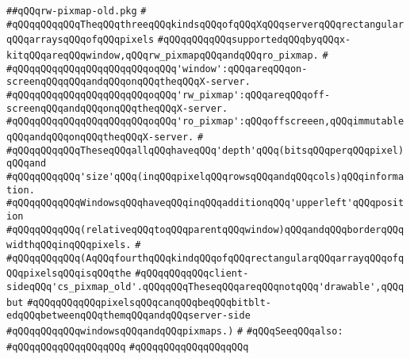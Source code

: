 \label{src/lib/x-kit/xclient/src/window/rw-pixmap-old.pkg}
\verb|##qQQqrw-pixmap-old.pkg|\newline
\verb|#|\newline
\verb|#qQQqqQQqqQQqTheqQQqthreeqQQqkindsqQQqofqQQqXqQQqserverqQQqrectangularqQQqarraysqQQqofqQQqpixels|\newline
\verb|#qQQqqQQqqQQqsupportedqQQqbyqQQqx-kitqQQqareqQQqwindow,qQQqrw_pixmapqQQqandqQQqro_pixmap.|\newline
\verb|#|\newline
\verb|#qQQqqQQqqQQqqQQqqQQqqQQqoqQQq'window':qQQqareqQQqon-screenqQQqqQQqandqQQqonqQQqtheqQQqX-server.|\newline
\verb|#qQQqqQQqqQQqqQQqqQQqqQQqoqQQq'rw_pixmap':qQQqareqQQqoff-screenqQQqandqQQqonqQQqtheqQQqX-server.|\newline
\verb|#qQQqqQQqqQQqqQQqqQQqqQQqoqQQq'ro_pixmap':qQQqoffscreeen,qQQqimmutableqQQqandqQQqonqQQqtheqQQqX-server.|\newline
\verb|#|\newline
\verb|#qQQqqQQqqQQqTheseqQQqallqQQqhaveqQQq'depth'qQQq(bitsqQQqperqQQqpixel)qQQqand|\newline
\verb|#qQQqqQQqqQQq'size'qQQq(inqQQqpixelqQQqrowsqQQqandqQQqcols)qQQqinformation.|\newline
\verb|#qQQqqQQqqQQqWindowsqQQqhaveqQQqinqQQqadditionqQQq'upperleft'qQQqposition|\newline
\verb|#qQQqqQQqqQQq(relativeqQQqtoqQQqparentqQQqwindow)qQQqandqQQqborderqQQqwidthqQQqinqQQqpixels.|\newline
\verb|#|\newline
\verb|#qQQqqQQqqQQq(AqQQqfourthqQQqkindqQQqofqQQqrectangularqQQqarrayqQQqofqQQqpixelsqQQqisqQQqthe|\newline
\verb|#qQQqqQQqqQQqclient-sideqQQq'cs_pixmap_old'.qQQqqQQqTheseqQQqareqQQqnotqQQq'drawable',qQQqbut|\newline
\verb|#qQQqqQQqqQQqpixelsqQQqcanqQQqbeqQQqbitblt-edqQQqbetweenqQQqthemqQQqandqQQqserver-side|\newline
\verb|#qQQqqQQqqQQqwindowsqQQqandqQQqpixmaps.)|\newline
\verb|#|\newline
\verb|#qQQqSeeqQQqalso:|\newline
\verb|#qQQqqQQqqQQqqQQqqQQq|\newline
\verb|#qQQqqQQqqQQqqQQqqQQq|\newline
